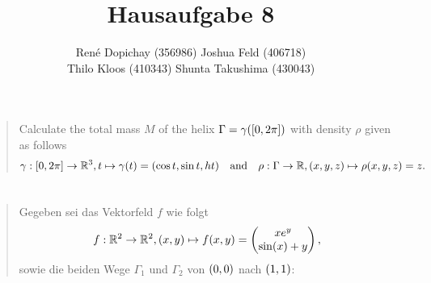 \documentclass{exercise}
\title{Hausaufgabe 8}
\author{René Dopichay (356986) \quad Joshua Feld (406718)\\Thilo Kloos (410343) \quad Shunta Takushima (430043)}
\begin{document}
	\maketitle


	\section{}

	\begin{quote}
		
	\end{quote}


	\section{}

	\begin{quote}
		Calculate the total mass \(M\) of the helix \(\Gamma = \gamma\parentheses*{\brackets*{0, 2\pi}}\) with density \(\rho\) given as follows
		\[
			\gamma: \brackets*{0, 2\pi} \to \R^3, t \mapsto \gamma\parentheses*{t} = \parentheses*{\cos t, \sin t, ht} \quad \text{and} \quad \rho: \Gamma \to \R, \parentheses*{x, y, z} \mapsto \rho\parentheses*{x, y, z} = z.
		\]
	\end{quote}


	\section{}

	\begin{quote}
		Gegeben sei das Vektorfeld \(f\) wie folgt
		\[
			f: \R^2 \to \R^2, \parentheses*{x, y} \mapsto f\parentheses*{x, y} = \begin{pmatrix}
				xe^y\\
				\sin\parentheses*{x} + y
			\end{pmatrix},
		\]
		sowie die beiden Wege \(\Gamma_1\) und \(\Gamma_2\) von \(\parentheses*{0, 0}\) nach \(\parentheses*{1, 1}\):
		\begin{center}
		\end{center}
	\end{quote}
\end{document}
